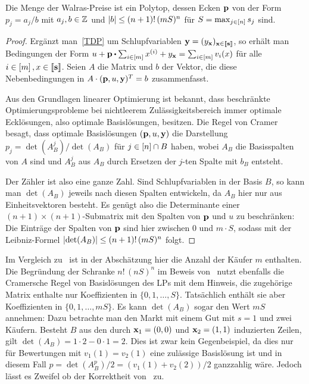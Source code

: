 \begin{lemma}\label{lemma-prices-bounded-S}
	Die Menge der Walras-Preise ist ein Polytop, dessen Ecken $\mathbf{p}$ von der Form $p_j = a_j/b$ mit $a_j,b\in\mathbb{Z}$ und
	$\left\lvert b \right\rvert \leq (n+1)!\, (mS)^n$
	für $S = \max_{j\in\left[ n \right]} s_j$ sind.
\end{lemma}
\begin{proof}
	Ergänzt man~\eqref{TDP} um Schlupfvariablen $\mathbf{y}=(y_{\mathbf{x}})_{\mathbf{x}\in\left\llbracket \mathbf{s} \right\rrbracket}$, so erhält man Bedingungen der Form $ u + \fp \bcdot \sum_{i\in\first{m}} x^{(i)} + y_{\fx} = \sum_{i\in\first{m}} v_i(x) $ für alle $i\in\left[ m \right], x\in\left\llbracket \mathbf{s} \right\rrbracket$.
	Seien $A$ die Matrix und $b$ der Vektor, die diese Nebenbedingungen in $A \cdot (\mathbf{p}, u, \mathbf{y})^T = b$ zusammenfasst.
	
	
	Aus den Grundlagen linearer Optimierung ist bekannt, dass beschränkte Optimierungsprobleme bei nichtleerem Zulässigkeitsbereich immer optimale Ecklösungen, also optimale Basislösungen, besitzen.
	Die Regel von Cramer besagt, dass optimale Basislösungen $(\mathbf{p}, u, \mathbf{y})$ die Darstellung $p_j = \det(A_B^j) / \det(A_B)$ für $j\in\left[ n \right]\cap B$ haben, wobei $A_B$ die Basisspalten von $A$ sind und $A_B^j$ aus $A_B$ durch Ersetzen der $j$-ten Spalte mit $b_B$ entsteht.
	
	Der Zähler ist also eine ganze Zahl.
	Sind Schlupfvariablen in der Basis $B$, so kann man $\det(A_B)$ jeweils nach diesen Spalten entwickeln, da $A_B$ hier nur aus Einheitsvektoren besteht.
	Es genügt also die Determinante einer $(n+1)\times(n+1)$-Submatrix mit den Spalten von $\mathbf{p}$ und $u$ zu beschränken:
 	Die Einträge der Spalten von $\mathbf{p}$ sind hier zwischen 0 und $m\cdot S$, sodass mit der Leibniz-Formel $\left\lvert \det(A_B) \right\rvert \leq (n+1)!\, (m S)^{n}$ folgt.
\end{proof}
\begin{bemerkung}
	Im Vergleich zu~\cite[Lemma~5]{PaesLeme2018} ist in der Abschätzung hier die Anzahl der Käufer $m$ enthalten.
	Die Begründung der Schranke $n!\,(nS)^n$ im Beweis von~\cite[Lemma~5]{PaesLeme2018} nutzt ebenfalls die Cramersche Regel von Basislösungen des LPs mit dem Hinweis, die zugehörige Matrix enthalte nur Koeffizienten in $\{0, 1,\dots, S\}$.
	Tatsächlich enthält sie aber Koeffizienten in $\{0, 1, \dots, mS \}$.
	Es kann $\det(A_B)$ sogar den Wert $mS$ annehmen: Dazu betrachte man den Markt mit einem Gut mit $s=1$ und zwei Käufern.
	Besteht $B$ aus den durch $\mathbf{x}_1 = (0,0)$ und $\mathbf{x}_2= (1,1)$ induzierten Zeilen, gilt $\det(A_B) = 1\cdot 2 - 0 \cdot 1 = 2$.
	Dies ist zwar kein Gegenbeispiel, da dies nur für Bewertungen mit $v_1(1) = v_2(1)$ eine zulässige Basislösung ist und in diesem Fall $p = \det({A_B^p}) / 2 = (v_1(1) + v_2(2)) / 2$ ganzzahlig wäre.
	Jedoch lässt es Zweifel ob der Korrektheit von~\cite[Lemma~5]{PaesLeme2018} zu.
\end{bemerkung}

